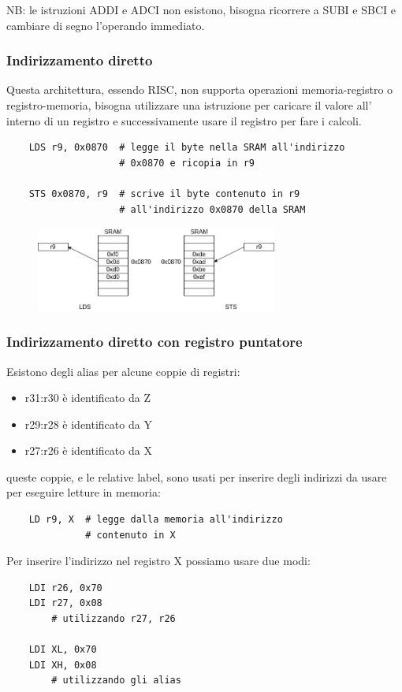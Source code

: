 NB: le istruzioni ADDI e ADCI non esistono, bisogna ricorrere a SUBI e SBCI e cambiare di segno l'operando immediato.

\subsubsection{Indirizzamento diretto}
Questa architettura, essendo RISC, non supporta operazioni memoria-registro o registro-memoria, bisogna utilizzare una istruzione per caricare il valore all' interno di un registro e successivamente usare il registro per fare i calcoli.
\begin{verbatim}
    LDS r9, 0x0870  # legge il byte nella SRAM all'indirizzo 
                    # 0x0870 e ricopia in r9
                    
    STS 0x0870, r9  # scrive il byte contenuto in r9
                    # all'indirizzo 0x0870 della SRAM
\end{verbatim}

\begin{figure}[H]
    \centering
    \includegraphics[width=300px]{images/5_Indirizzamento/LDS_STS.png}
\end{figure}

\subsubsection{Indirizzamento diretto con registro puntatore}
Esistono degli alias per alcune coppie di registri:
\begin{itemize}
    \item r31:r30 è identificato da Z
    \item r29:r28 è identificato da Y
    \item r27:r26 è identificato da X
\end{itemize}
queste coppie, e le relative label, sono usati per inserire degli indirizzi da usare per eseguire letture in memoria:
\begin{verbatim}
    LD r9, X  # legge dalla memoria all'indirizzo
              # contenuto in X
\end{verbatim}
Per inserire l'indirizzo nel registro X possiamo usare due modi:
\begin{verbatim}
    LDI r26, 0x70
    LDI r27, 0x08
        # utilizzando r27, r26
    
    LDI XL, 0x70
    LDI XH, 0x08
        # utilizzando gli alias
\end{verbatim}

